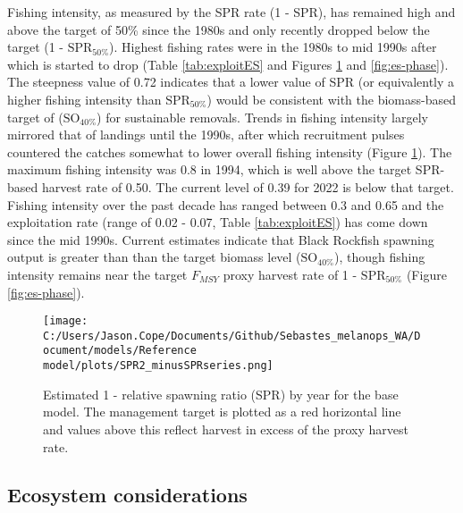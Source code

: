 \documentclass[11pt,
  english,
  letterpaper,
]{article}
\begin{document}
Fishing intensity, as measured by the SPR rate (1 - SPR), has remained high and above the target of 50\% since the 1980s and only recently dropped below the target (1 - \(\text{SPR}_{50\%}\)). Highest fishing rates were in the 1980s to mid 1990s after which is started to drop (Table \ref{tab:exploitES} and Figures \ref{fig:es-1-spr} and \ref{fig:es-phase}). The steepness value of 0.72 indicates that a lower value of SPR (or equivalently a higher fishing intensity than \(\text{SPR}_{50\%}\)) would be consistent with the biomass-based target of (\(\text{SO}_{40\%}\)) for sustainable removals. Trends in fishing intensity largely mirrored that of landings until the 1990s, after which recruitment pulses countered the catches somewhat to lower overall fishing intensity (Figure \ref{fig:es-1-spr}). The maximum fishing intensity was 0.8 in 1994, which is well above the target SPR-based harvest rate of 0.50. The current level of 0.39 for 2022 is below that target. Fishing intensity over the past decade has ranged between 0.3 and 0.65 and the exploitation rate (range of 0.02 - 0.07, Table \ref{tab:exploitES}) has come down since the mid 1990s. Current estimates indicate that Black Rockfish spawning output is greater than than the target biomass level (\(\text{SO}_{40\%}\)), though fishing intensity remains near the target \(F_{MSY}\) proxy harvest rate of 1 - \(\text{SPR}_{50\%}\) (Figure \ref{fig:es-phase}).



\begin{figure}
\centering
\texttt{[image: C:/Users/Jason.Cope/Documents/Github/Sebastes\_melanops\_WA/Document/models/Reference model/plots/SPR2\_minusSPRseries.png]}
\caption{Estimated 1 - relative spawning ratio (SPR) by year for the base model. The management target is plotted as a red horizontal line and values above this reflect harvest in excess of the proxy harvest rate.\label{fig:es-1-spr}}
\end{figure}

\clearpage

\hypertarget{ecosystem-considerations}{%
\subsection*{Ecosystem considerations}\label{ecosystem-considerations}}
\end{document}
